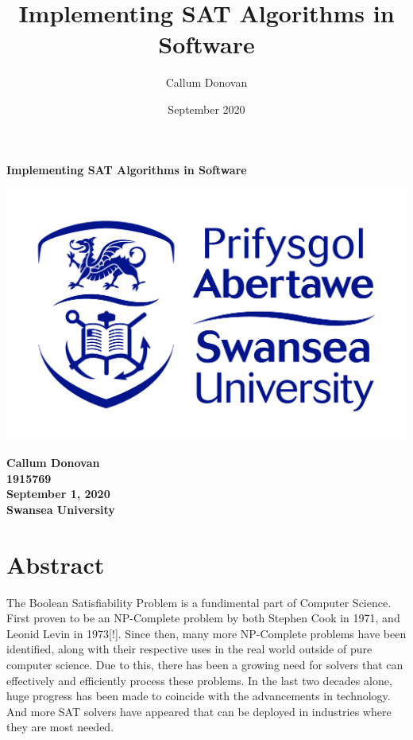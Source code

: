 \documentclass{article}
\title{\bfseries Implementing SAT Algorithms in Software}
\author{Callum Donovan}
\date{September 2020}
\begin{document}
\begin{titlepage}
    \begin{center}
        \Large{\bfseries Implementing SAT Algorithms in Software} \\
        \vspace{4cm}
        \begin{center}
            \includegraphics[scale=0.2]{swan.jpg}
        \end{center}
        \vspace*{\fill}
        \bfseries{\large Callum Donovan \\
            1915769 \\
            September 1, 2020 \\
            Swansea University \\}
    \end{center}
\end{titlepage}

\section{Abstract}
The Boolean Satisfiability Problem is a fundimental part of Computer Science. First proven to be an
NP-Complete problem by both Stephen Cook in 1971, and Leonid Levin in 1973[!]. Since then, many more
NP-Complete problems have been identified, along with their respective uses in the real world
outside of pure computer science. Due to this, there has been a growing need for solvers that can
effectively and efficiently process these problems. In the last two decades alone, huge progress has
been made to coincide with the advancements in technology. And more SAT solvers have appeared that
can be deployed in industries where they are most needed. 
\end{document}

